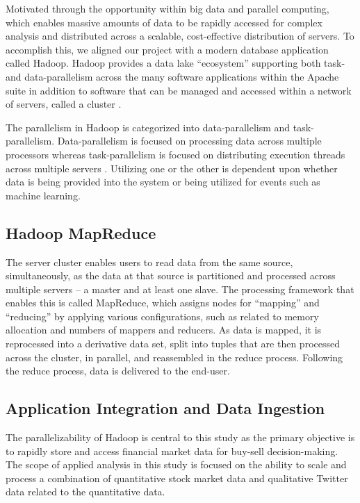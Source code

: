 \documentclass[journal]{IEEEtran}
\begin{document}
Motivated through the opportunity within big data and parallel computing,
which enables massive amounts of data to be rapidly accessed for complex
analysis and distributed across a scalable, cost-effective distribution of
servers. To accomplish this, we aligned our project with a modern database
application called Hadoop. Hadoop provides a data lake ``ecosystem'' 
supporting both task- and data-parallelism across the many software
applications within the Apache suite in addition to software that can 
be managed and accessed within a network of servers, called a cluster \cite{Intel, BigDataComputing}.

The parallelism in Hadoop is categorized into data-parallelism and task-parallelism.
Data-parallelism is focused on processing data across multiple processors whereas task-parallelism is focused on distributing execution threads across multiple servers \cite{Parallelism}. Utilizing one or the other is dependent upon whether data is being provided into the system or being utilized for events such as machine learning.

\subsection{Hadoop MapReduce}

The server cluster enables users to read data from the same source,
simultaneously, as the data at that source is partitioned and
processed across multiple servers – a master and at least one slave. 
The processing framework that enables this is called MapReduce, 
which assigns nodes for ``mapping'' and ``reducing'' by applying 
various configurations, such as related to memory allocation and numbers
of mappers and reducers. As data is mapped, it is reprocessed into a derivative 
data set, split into tuples that are then processed across the cluster, in parallel, and reassembled in the reduce process. Following the reduce process, data is delivered to 
the end-user.

\subsection{Application Integration and Data Ingestion}

The parallelizability of Hadoop is central to this study as the primary
 objective is to rapidly store and access financial market data for 
 buy-sell decision-making. 
The scope of applied analysis in this study is focused on the ability to
 scale and process a combination of quantitative stock market data and
 qualitative Twitter data related to the quantitative data. 
\end{document}
